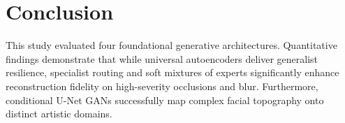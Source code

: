 \documentclass[conference]{IEEEtran}
\begin{document}
\section{Conclusion}
This study evaluated four foundational generative architectures. Quantitative findings demonstrate that while universal autoencoders deliver generalist resilience, specialist routing and soft mixtures of experts significantly enhance reconstruction fidelity on high-severity occlusions and blur. Furthermore, conditional U-Net GANs successfully map complex facial topography onto distinct artistic domains.



\end{document}
